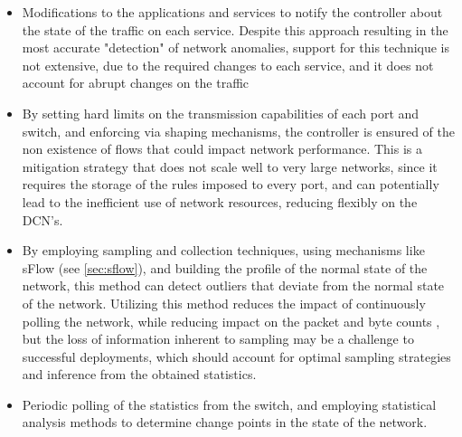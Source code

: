 \begin {itemize}
    \item Modifications to the applications and services to notify the controller about the state of the traffic on each service. Despite this approach resulting
         in the most accurate "detection" of network anomalies, support for this technique is not extensive, due to the required changes to each service, 
         and it does not account for abrupt changes on the traffic
    \item By setting hard limits on the transmission capabilities of each port and switch, and enforcing via shaping mechanisms, the controller is ensured of the 
        non existence of flows that could impact network performance. This is a mitigation strategy that does not scale well to very large networks, since it 
        requires the storage of the rules imposed to every port, and can potentially lead to the inefficient use of network resources, reducing flexibly on the DCN's.
    \item By employing sampling and collection techniques, using mechanisms like sFlow (see \ref{sec:sflow}), and building the profile of the normal state of 
        the network, this method can detect outliers that deviate from the normal state of the network. Utilizing this method reduces the impact of continuously 
        polling the network, while reducing impact on the packet and byte counts \cite{brauckhoff_impact_2006}, but the loss of information inherent to
        sampling may be a challenge to successful deployments, which should account for optimal sampling strategies and inference from the obtained statistics.
    \item Periodic polling of the statistics from the switch, and employing statistical analysis methods to determine change points in the state of the network.
\end {itemize}

